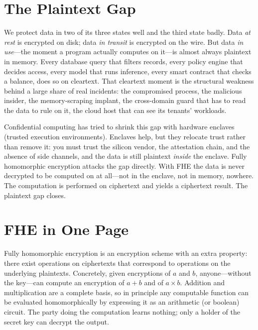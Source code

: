 \documentclass[11pt,letterpaper]{article}
\begin{document}
\tableofcontents
\newpage

\section{The Plaintext Gap}

We protect data in two of its three states well and the third state badly. Data
\emph{at rest} is encrypted on disk; data \emph{in transit} is encrypted on the
wire. But data \emph{in use}---the moment a program actually computes on it---is
almost always plaintext in memory. Every database query that filters records,
every policy engine that decides access, every model that runs inference, every
smart contract that checks a balance, does so on cleartext. That cleartext moment
is the structural weakness behind a large share of real incidents: the compromised
process, the malicious insider, the memory-scraping implant, the cross-domain
guard that has to read the data to rule on it, the cloud host that can see its
tenants' workloads.

Confidential computing has tried to shrink this gap with hardware enclaves (trusted
execution environments). Enclaves help, but they relocate trust rather than remove
it: you must trust the silicon vendor, the attestation chain, and the absence of
side channels, and the data is still plaintext \emph{inside} the enclave. Fully
homomorphic encryption attacks the gap directly. With FHE the data is never
decrypted to be computed on at all---not in the enclave, not in memory, nowhere.
The computation is performed on ciphertext and yields a ciphertext result. The
plaintext gap closes.

\section{FHE in One Page}

Fully homomorphic encryption is an encryption scheme with an extra property: there
exist operations on ciphertexts that correspond to operations on the underlying
plaintexts. Concretely, given encryptions of $a$ and $b$, anyone---without the
key---can compute an encryption of $a+b$ and of $a\times b$. Addition and
multiplication are a complete basis, so in principle any computable function can be
evaluated homomorphically by expressing it as an arithmetic (or boolean) circuit.
The party doing the computation learns nothing; only a holder of the secret key can
decrypt the output.
\end{document}
